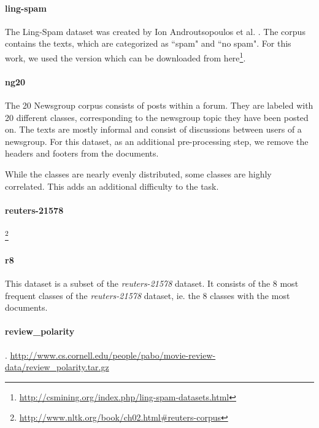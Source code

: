 
\paragraph{ling-spam}
The Ling-Spam dataset was created by Ion Androutsopoulos et al. \cite{Androutsopoulos2000}.
The corpus contains the texts, which are categorized as ``spam" and ``no spam". For this work, we used the version which can be downloaded from here\footnote{\url{http://csmining.org/index.php/ling-spam-datasets.html}}.

\paragraph{ng20}
The 20 Newsgroup corpus \cite{Lang} consists of posts within a forum. They are labeled with 20 different classes, corresponding to the newsgroup topic they have been posted on. The texts are mostly informal and consist of discussions between users of a newsgroup.
For this dataset, as an additional pre-processing step, we remove the headers and footers from the documents.

While the classes are nearly evenly distributed, some classes are highly correlated. This adds an additional difficulty to the task.


\paragraph{reuters-21578}
\footnote{\url{http://www.nltk.org/book/ch02.html#reuters-corpus}}

\paragraph{r8}
This dataset is a subset of the \textit{reuters-21578} dataset.
It consists of the 8 most frequent classes of the \textit{reuters-21578} dataset, ie. the 8 classes with the most documents.

\paragraph{review\_polarity}
\cite{Pang2004}.
\url{http://www.cs.cornell.edu/people/pabo/movie-review-data/review_polarity.tar.gz}

